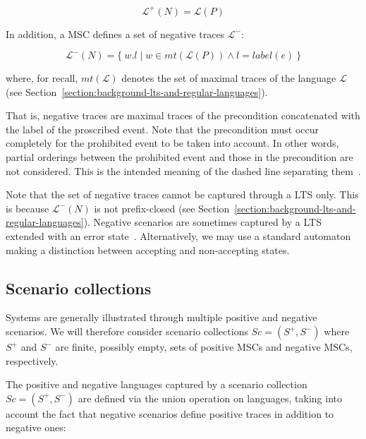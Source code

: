 \vspace{-0.2cm}
\begin{equation*}
\mathcal{L}^{+}(N) = \mathcal{L}(P)
\end{equation*}

\noindent In addition, a MSC defines a set of negative traces $\mathcal{L}^{-}$:

\vspace{-0.2cm}
\begin{equation*}
\mathcal{L}^{-}(N) = \{~w.l \mid w \in mt(\mathcal{L}(P)) \wedge l = label(e)~\}
\end{equation*}

\noindent where, for recall, $mt(\mathcal{L})$ denotes the set of maximal traces of the language $\mathcal{L}$ (see Section~\ref{section:background-lts-and-regular-languages}).

That is, negative traces are maximal traces of the precondition concatenated with the label of the proscribed event. Note that the precondition must occur completely for the prohibited event to be taken into account. In other words, partial orderings between the prohibited event and those in the precondition are not considered. This is the intended meaning of the dashed line separating them~\cite{Uchitel:2004}. 

Note that the set of negative traces cannot be captured through a LTS only. This is because $\mathcal{L}^{-}(N)$ is not prefix-closed (see Section~\ref{section:background-lts-and-regular-languages}). Negative scenarios are sometimes captured by a LTS extended with an error state~\cite{Uchitel:2004}. Alternatively, we may use a standard automaton making a distinction between accepting and non-accepting states. 

\subsection{Scenario collections\label{subsection:background-scenario-collections}}

Systems are generally illustrated through multiple positive and negative scenarios. We will therefore consider scenario collections $Sc = (S^+,S^-)$ where $S^+$ and $S^-$ are finite, possibly empty, sets of positive MSCs and negative MSCs, respectively.

The positive and negative languages captured by a scenario collection $Sc = (S^+,S^-)$ are defined via the union operation on languages, taking into account the fact that negative scenarios define positive traces in addition to negative ones:

